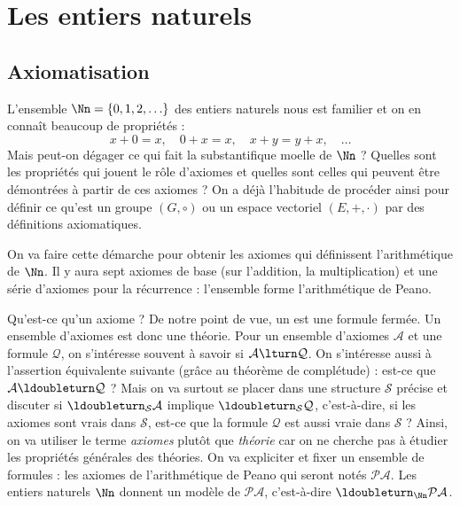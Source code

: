 \documentclass[11pt,class=report,crop=false]{standalone}
\begin{document}







\section{Les entiers naturels}

\subsection{Axiomatisation}

L'ensemble $\Nn = \{0, 1, 2, \ldots \}$ des entiers naturels nous est familier et on en connaît beaucoup de propriétés : 
\[ x+0=x, \quad 0+x=x, \quad x+y=y+x, \quad \dots \]
Mais peut-on dégager ce qui fait la \og{}substantifique moelle\fg{} de $\Nn$ ? Quelles sont les propriétés qui jouent le rôle d'axiomes et quelles sont celles qui peuvent être démontrées à partir de ces axiomes ? On a déjà l'habitude de procéder ainsi pour définir ce qu'est un groupe $(G, \circ)$ ou un espace vectoriel $(E, +, \cdot)$ par des définitions axiomatiques. 


On va faire cette démarche pour obtenir les axiomes qui définissent l'arithmétique de $\Nn$. 
Il y aura sept axiomes de base (sur l'addition, la multiplication) et une série d'axiomes pour la récurrence : l'ensemble forme l'arithmétique de Peano.

Qu'est-ce qu'un axiome ? De notre point de vue, un  est une formule fermée. 
Un ensemble d'axiomes est donc une théorie. 
Pour un ensemble d'axiomes $\mathcal{A}$ et une formule $\mathcal{Q}$, on s'intéresse souvent à savoir si $\mathcal{A} \lturn \mathcal{Q}$. On s'intéresse aussi à l'assertion équivalente suivante (grâce au théorème de complétude) : est-ce que $\mathcal{A} \ldoubleturn \mathcal{Q}$ ?
Mais on va surtout se placer dans une structure $\mathcal{S}$ précise et discuter si $\ldoubleturn_{\mathcal{S}} \mathcal{A}$ implique $\ldoubleturn_{\mathcal{S}} \mathcal{Q}$, c'est-à-dire, si les axiomes sont vrais dans $\mathcal{S}$, est-ce que la formule $\mathcal{Q}$ est aussi vraie dans $\mathcal{S}$ ? 
Ainsi, on va utiliser le terme \emph{axiomes} plutôt que \emph{théorie} car on ne cherche pas à étudier les propriétés générales des théories. On va expliciter et fixer un ensemble de formules : 
les axiomes de l'arithmétique de Peano qui seront notés $\mathcal{PA}$. 
Les entiers naturels $\Nn$ donnent un modèle de $\mathcal{PA}$, c'est-à-dire $\ldoubleturn_{\Nn} \mathcal{PA}$.
\end{document}
